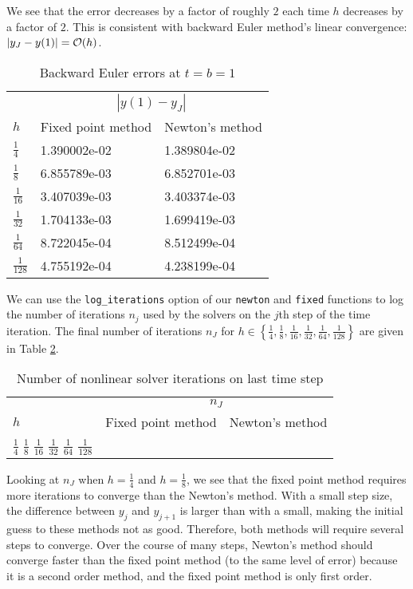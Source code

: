 \documentclass{homework}
\begin{document}
\begin{alphaparts}
		We see that the error decreases by a factor of roughly $2$ each time $h$ decreases by a factor of $2$. This is consistent with backward Euler method's linear convergence: $|y_J - y(1)| = \mathcal{O}(h)$.
		\begin{table}[H]
			\centering
			\begin{tabular}{@{}lll@{}}
				\toprule
				& \multicolumn{2}{c}{$|y(1) - y_J|$} \\
				\cmidrule{2-3}
				$h$ & Fixed point method & Newton's method \\
				\midrule
				$\frac{1}{4}$ & 1.390002e-02 & 1.389804e-02 \\[0.4em]
				$\frac{1}{8}$ & 6.855789e-03 & 6.852701e-03 \\[0.4em]
				$\frac{1}{16}$ & 3.407039e-03 & 3.403374e-03 \\[0.4em]
				$\frac{1}{32}$ & 1.704133e-03 & 1.699419e-03 \\[0.4em]
				$\frac{1}{64}$ & 8.722045e-04 & 8.512499e-04 \\[0.4em]
				$\frac{1}{128}$ & 4.755192e-04 & 4.238199e-04 \\[0.4em]
				\bottomrule
			\end{tabular}
			\caption{Backward Euler errors at $t = b = 1$}
			\label{table:p6:c}
		\end{table}
		
		\questionpart 
		We can use the \verb*|log_iterations| option of our \verb*|newton| and \verb*|fixed| functions to log the number of iterations $n_j$ used by the solvers on the $j$th step of the time iteration. The final number of iterations $n_J$ for $h \in \left\{\frac{1}{4}, \frac{1}{8}, \frac{1}{16}, \frac{1}{32}, \frac{1}{64}, \frac{1}{128}\right\}$ are given in Table \ref{table:p6:d}.
		\begin{table}[H]
			\centering
			\begin{tabular}{@{}lll@{}}
				\toprule
				& \multicolumn{2}{c}{$n_J$} \\
				\cmidrule{2-3}
				$h$ & Fixed point method & Newton's method \\
				\midrule 
				$\frac{1}{4}$ 
				$\frac{1}{8}$ 
				$\frac{1}{16}$
				$\frac{1}{32}$ 
				$\frac{1}{64}$
				$\frac{1}{128}$ 
				\bottomrule
			\end{tabular}
			\caption{Number of nonlinear solver iterations on last time step}
			\label{table:p6:d}
		\end{table}
		\end{alphaparts}
		Looking at $n_J$ when $h = \frac{1}{4}$ and $h = \frac{1}{8}$, we see that the fixed point method requires more iterations to converge than the Newton's method. With a small step size, the difference between $y_j$ and $y_{j+1}$ is larger than with a small, making the initial guess to these methods not as good. Therefore, both methods will require several steps to converge. Over the course of many steps, Newton's method should converge faster than the fixed point method (to the same level of error) because it is a second order method, and the fixed point method is only first order.
		
		\question 
\end{document}
